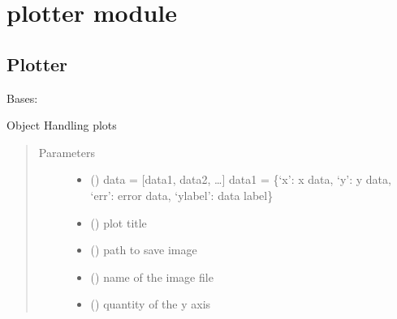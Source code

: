 \documentclass[letterpaper,10pt,english]{sphinxmanual}
\begin{document}
\section{plotter module}
\label{\detokenize{api/postprocessing:plotter-module}}

\subsection{Plotter}
\label{\detokenize{api/postprocessing:plotter}}

\begin{fulllineitems}
\label{\detokenize{api/postprocessing:plotter.Plotter}}
Bases: 

Object Handling plots
\begin{quote}\begin{description}
\item[{Parameters}] \leavevmode\begin{itemize}
\item {} 
 () \textendash{} data = {[}data1, data2, …{]}
data1 = \{‘x’: x data, ‘y’: y data, ‘err’: error data,
‘ylabel’: data label\}

\item {} 
 () \textendash{} plot title

\item {} 
 () \textendash{} path to save image

\item {} 
 () \textendash{} name of the image file

\item {} 
 () \textendash{} quantity of the y axis


\end{itemize}
\end{description}
\end{quote}
\end{fulllineitems}
\end{document}
